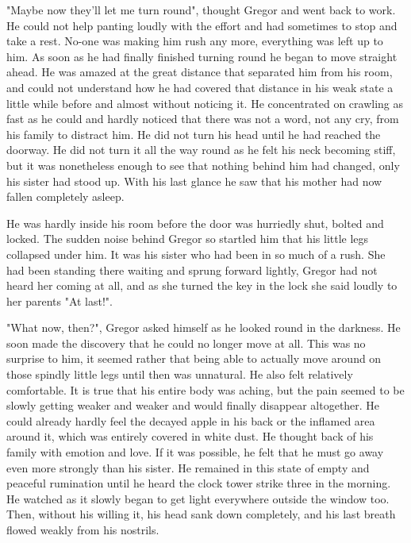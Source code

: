\documentclass[12pt]{book}
\begin{document}
    "Maybe now they'll let me turn round", thought Gregor and went back to work. He could not help panting loudly with the effort and had sometimes to stop and take a rest. No-one was making him rush any more, everything was left up to him. As soon as he had finally finished turning round he began to move straight ahead. He was amazed at the great distance that separated him from his room, and could not understand how he had covered that distance in his weak state a little while before and almost without noticing it. He concentrated on crawling as fast as he could and hardly noticed that there was not a word, not any cry, from his family to distract him. He did not turn his head until he had reached the doorway. He did not turn it all the way round as he felt his neck becoming stiff, but it was nonetheless enough to see that nothing behind him had changed, only his sister had stood up. With his last glance he saw that his mother had now fallen completely asleep.

    He was hardly inside his room before the door was hurriedly shut, bolted and locked. The sudden noise behind Gregor so startled him that his little legs collapsed under him. It was his sister who had been in so much of a rush. She had been standing there waiting and sprung forward lightly, Gregor had not heard her coming at all, and as she turned the key in the lock she said loudly to her parents "At last!".

    "What now, then?", Gregor asked himself as he looked round in the darkness. He soon made the discovery that he could no longer move at all. This was no surprise to him, it seemed rather that being able to actually move around on those spindly little legs until then was unnatural. He also felt relatively comfortable. It is true that his entire body was aching, but the pain seemed to be slowly getting weaker and weaker and would finally disappear altogether. He could already hardly feel the decayed apple in his back or the inflamed area around it, which was entirely covered in white dust. He thought back of his family with emotion and love. If it was possible, he felt that he must go away even more strongly than his sister. He remained in this state of empty and peaceful rumination until he heard the clock tower strike three in the morning. He watched as it slowly began to get light everywhere outside the window too. Then, without his willing it, his head sank down completely, and his last breath flowed weakly from his nostrils.
\end{document}
